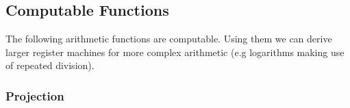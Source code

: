 \subsection{Computable Functions}
The following arithmetic functions are computable. Using them we can derive larger register machines for more complex arithmetic (e.g logarithms making use of repeated division).
\subsubsection{Projection}

